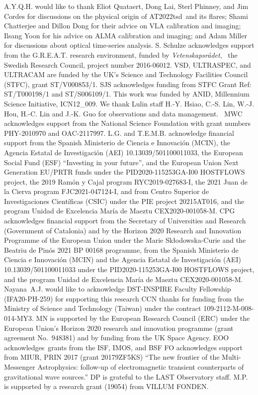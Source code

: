 \documentclass{nature_plusfigure}
\newcommand{\at}{AT2022tsd}
\begin{document}
\begin{addendum}

\item A.Y.Q.H. would like to thank Eliot Quataert, Dong Lai, Sterl Phinney, and Jim Cordes for discussions on the physical origin of \at\ and its flares; Shami Chatterjee and Dillon Dong for their advice on VLA calibration and imaging; Ilsang Yoon for his advice on ALMA calibration and imaging; and Adam Miller for discussions about optical time-series analysis.
S. Schulze acknowledges support from the G.R.E.A.T. research environment, funded by {\em Vetenskapsr\aa det},  the Swedish Research Council, project number 2016-06012.
VSD, ULTRASPEC, and ULTRACAM are funded by the UK’s Science and Technology Facilities Council (STFC), grant ST/V000853/1.
SJS acknowledges funding from STFC Grant Ref: ST/T000198/1 and ST/S006109/1.
This work was funded by ANID, Millennium Science Initiative, ICN12\_009.
We thank Lulin staff H.-Y. Hsiao, C.-S. Lin, W.-J. Hou, H.-C. Lin and J.-K. Guo for observations and data management. 
MWC acknowledges support from the National Science Foundation with grant numbers PHY-2010970 and OAC-2117997.
L.G. and T.E.M.B. acknowledge financial support from the Spanish Ministerio de Ciencia e Innovaci\'on (MCIN), the Agencia Estatal de Investigaci\'on (AEI) 10.13039/501100011033, the European Social Fund (ESF) “Investing in your future”, and the European Union Next Generation EU/PRTR funds under the PID2020-115253GA-I00 HOSTFLOWS project, the 2019 Ram\'on y Cajal program RYC2019-027683-I, the 2021 Juan de la Cierva program FJC2021-047124-I, and from Centro Superior de Investigaciones Cient\'ificas (CSIC) under the PIE project 20215AT016, and the program Unidad de Excelencia Mar\'ia de Maeztu CEX2020-001058-M.
CPG acknowledges financial support from the Secretary of Universities
and Research (Government of Catalonia) and by the Horizon 2020 Research
and Innovation Programme of the European Union under the Marie
Sk\l{}odowska-Curie and the Beatriu de Pin\'os 2021 BP 00168 programme,
from the Spanish Ministerio de Ciencia e Innovaci\'on (MCIN) and the
Agencia Estatal de Investigaci\'on (AEI) 10.13039/501100011033 under the
PID2020-115253GA-I00 HOSTFLOWS project, and the program Unidad de
Excelencia Mar\'ia de Maeztu CEX2020-001058-M.
Nayana A.J. would like to acknowledge DST-INSPIRE Faculty Fellowship (IFA20-PH-259) for supporting this research
CCN thanks for funding from the Ministry of Science and Technology (Taiwan) under the contract 109-2112-M-008-014-MY3.
MN is supported by the European Research Council (ERC) under the European Union’s Horizon 2020 research and innovation programme (grant agreement No.~948381) and by funding from the UK Space Agency.
EOO acknowledges grants from the ISF, IMOS, and BSF
FO acknowledges support from MIUR, PRIN 2017 (grant 20179ZF5KS) ``The new frontier of the Multi-Messenger Astrophysics: follow-up of electromagnetic transient counterparts of gravitational wave sources.''
DP is grateful to the LAST Observatory staff.
M.P. is supported by a research grant (19054) from VILLUM FONDEN.


\end{addendum}
\end{document}
